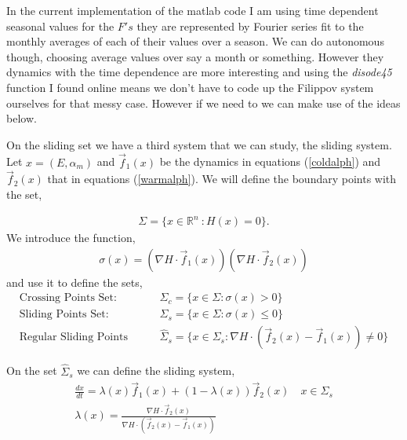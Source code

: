 \documentclass[10pt]{article}
\begin{document}
In the current implementation of the matlab code I am using time dependent seasonal values for the $F's$ they are represented by Fourier series fit to the monthly averages of each of their values over a season. We can do autonomous though, choosing average values over say a month or something. However they dynamics with the time dependence are more interesting and using the {\it disode45} function I found online means we don't have to code up the Filippov system ourselves for that messy case. However if we need to we can make use of the ideas below. 


On the sliding set we have a third system that we can study, the sliding system. Let $x=(E,\alpha_m)$  and $\vec{f}_1(x)$ be the dynamics in equations (\ref{coldalph}) and $\vec{f}_2(x)$ that in equations (\ref{warmalph}). We will define the boundary points with the set,

\begin{align}
\Sigma=\{ x \in \mathbb{R}^n \ : H(x)=0\}. \label{boundary}
\end{align}
We introduce the function,
\begin{align}
\sigma(x)=\left( \nabla H \cdot \vec{f}_1(x) \right) \left( \nabla H \cdot \vec{f}_2(x) \right) \label{sigdot}
\end{align}
and use it to define the sets,
\begin{align}
&\textrm{Crossing Points Set:}& \quad &\Sigma_c =\{ x \in \Sigma : \sigma(x)>0\}&\\
&\textrm{Sliding Points Set:}&\quad &\Sigma_s= \{ x \in \Sigma: \sigma(x)\leq 0\}& \\
 &\textrm{Regular Sliding Points Set:}& \quad &\hat{\Sigma}_s=\{x\in \Sigma_s : \nabla H \cdot (\vec{f}_2(x) -\vec{f}_1(x)) \neq 0\}&
\end{align} 

On the set $\hat{\Sigma}_s$ we can define the sliding system,
\begin{align}
\frac{dx}{dt}=\lambda(x)\vec{f}_1(x) + (1-\lambda(x))\vec{f}_2(x) \quad x\in \hat{\Sigma}_s\\
\lambda(x)=\frac{\nabla H \cdot \vec{f}_2(x)}{\nabla H \cdot \left( \vec{f}_2(x)-\vec{f}_1(x)\right)}
\end{align}
\end{document}
